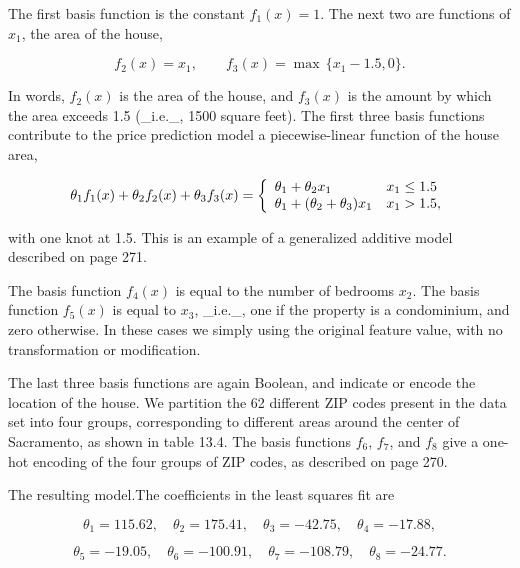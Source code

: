 The first basis function is the constant \(f_{1}(x)=1\). The next two are functions of \(x_{1}\), the area of the house,

\[f_{2}(x)=x_{1},\qquad f_{3}(x)=\max\,\{x_{1}-1.5,0\}.\]

In words, \(f_{2}(x)\) is the area of the house, and \(f_{3}(x)\) is the amount by which the area exceeds 1.5 (_i.e._, 1500 square feet). The first three basis functions contribute to the price prediction model a piecewise-linear function of the house area,

\[\theta_{1}f_{1}(x)+\theta_{2}f_{2}(x)+\theta_{3}f_{3}(x)=\left\{\begin{array}[ ]{ll}\theta_{1}+\theta_{2}x_{1}&x_{1}\leq 1.5\\ \theta_{1}+(\theta_{2}+\theta_{3})x_{1}&x_{1}>1.5,\end{array}\right.\]

with one knot at 1.5. This is an example of a generalized additive model described on page 271.

The basis function \(f_{4}(x)\) is equal to the number of bedrooms \(x_{2}\). The basis function \(f_{5}(x)\) is equal to \(x_{3}\), _i.e._, one if the property is a condominium, and zero otherwise. In these cases we simply using the original feature value, with no transformation or modification.

The last three basis functions are again Boolean, and indicate or encode the location of the house. We partition the 62 different ZIP codes present in the data set into four groups, corresponding to different areas around the center of Sacramento, as shown in table 13.4. The basis functions \(f_{6}\), \(f_{7}\), and \(f_{8}\) give a one-hot encoding of the four groups of ZIP codes, as described on page 270.

The resulting model.The coefficients in the least squares fit are

\[\theta_{1}=115.62,\quad\theta_{2}=175.41,\quad\theta_{3}=-42.75,\quad\theta_{4 }=-17.88,\]

\[\theta_{5}=-19.05,\quad\theta_{6}=-100.91,\quad\theta_{7}=-108.79,\quad\theta_{ 8}=-24.77.\]

